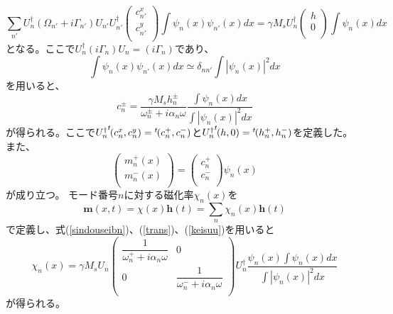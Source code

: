 \begin{equation}
\sum\limits_{n'} {{U_n^\dag}} \left( {{\Omega _{n'}} + i{\Gamma _{n'}}} \right)U_{n'}{U_{n'}^\dag }\left( {\begin{array}{*{20}{c}}
   {c_{n'}^x}  \\
   {c_{n'}^y}  \\
\end{array}} \right)\int {{\psi _n}(x){\psi _{n'}}(x)dx}  = \gamma {M_s}{U_n^\dag}\left( {\begin{array}{*{20}{c}}
   h  \\
   0  \\
\end{array}} \right)\int {{\psi _n}(x)dx} 
\end{equation}
となる。ここで$U_n^\dag (i\Gamma_n) U_n=(i \Gamma_n)$であり、
\begin{equation}
\int {{\psi _n}(x){\psi _{n'}}(x)dx}  \simeq {\delta _{nn'}}\int {\left| {{\psi _n}{{(x)}}} \right|^2dx} 
\end{equation}
を用いると、
\begin{equation}
c_n^ \pm  = \frac{{\gamma {M_s}h_n^ \pm }}{{\omega _n^ \pm + i{\alpha _n}\omega }}\frac{{\int {{\psi _n}(x)dx} }}{{\int {\left| {{\psi _n}{{(x)}}} \right|^2dx} }}\label{keisuu}
\end{equation}
が得られる。ここで$ {U_n^\dag}^t\hspace{-1mm}\left( {c_n^x,c_n^y} \right)={}^t\hspace{-1mm}\left( {c_n^ + ,c_n^ - } \right) $と$ {U_n^\dag}^t\hspace{-1mm}\left( {h,0} \right)=
 {}^t\hspace{-1mm}\left( {h_n^ + ,h_n^ - } \right)$を定義した。
また、
\begin{equation}
\left( {\begin{array}{*{20}{c}}
   {m_n^ + (x)}  \\
   {m_n^ - (x)}  \\
\end{array}} \right) = \left( {\begin{array}{*{20}{c}}
   {c_n^ + }  \\
   {c_n^ - }  \\
\end{array}} \right){\psi _n}(x)
\end{equation}
が成り立つ。
モード番号$n$に対する磁化率$\chi_n(x)$を
\begin{equation}
\bm{m}(x,t) ={{\chi }(x)\bm{h}(t)} = \sum\limits_n {{\chi _n}(x)\bm{h}(t)} 
\end{equation}
で定義し、式(\ref{sindouseibn})、(\ref{trans})、(\ref{keisuu})を用いると
\begin{equation}
{\chi _n}(x) = \gamma {M_s}U_n \left( {\begin{array}{*{20}{c}}
   {\dfrac{1}{{\omega _n^ +  + i{\alpha _n}\omega }}} & 0  \\
   0 & {\dfrac{1}{{\omega _n^ -  + i{\alpha _n}\omega }}}  \\
\end{array}} \right){U_n^\dag}\frac{{{\psi _n}(x)\int {{\psi _n}(x)dx} }}{{\int {\left| {{\psi _n}{{(x)}}} \right|^2dx} }}
\end{equation}
が得られる。

